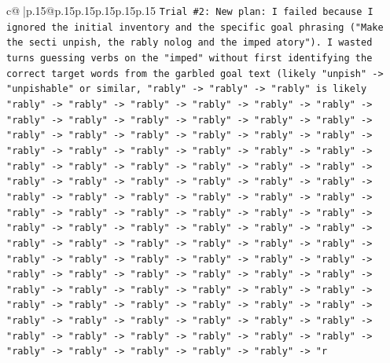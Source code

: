 \documentclass{article}
\begin{document}
{\begin{supertabular}{c@{$\;$}|p{.15\linewidth}@{}p{.15\linewidth}p{.15\linewidth}p{.15\linewidth}p{.15\linewidth}p{.15\linewidth}}
{{{\texttt{Trial \#2: New plan: I failed because I ignored the initial inventory and the specific goal phrasing ("Make the secti unpish, the rably nolog and the imped atory"). I wasted turns guessing verbs on the "imped" without first identifying the correct target words from the garbled goal text (likely "unpish" {-}> "unpishable" or similar, "rably" {-}> "rably" {-}> "rably" is likely "rably" {-}> "rably" {-}> "rably" {-}> "rably" {-}> "rably" {-}> "rably" {-}> "rably" {-}> "rably" {-}> "rably" {-}> "rably" {-}> "rably" {-}> "rably" {-}> "rably" {-}> "rably" {-}> "rably" {-}> "rably" {-}> "rably" {-}> "rably" {-}> "rably" {-}> "rably" {-}> "rably" {-}> "rably" {-}> "rably" {-}> "rably" {-}> "rably" {-}> "rably" {-}> "rably" {-}> "rably" {-}> "rably" {-}> "rably" {-}> "rably" {-}> "rably" {-}> "rably" {-}> "rably" {-}> "rably" {-}> "rably" {-}> "rably" {-}> "rably" {-}> "rably" {-}> "rably" {-}> "rably" {-}> "rably" {-}> "rably" {-}> "rably" {-}> "rably" {-}> "rably" {-}> "rably" {-}> "rably" {-}> "rably" {-}> "rably" {-}> "rably" {-}> "rably" {-}> "rably" {-}> "rably" {-}> "rably" {-}> "rably" {-}> "rably" {-}> "rably" {-}> "rably" {-}> "rably" {-}> "rably" {-}> "rably" {-}> "rably" {-}> "rably" {-}> "rably" {-}> "rably" {-}> "rably" {-}> "rably" {-}> "rably" {-}> "rably" {-}> "rably" {-}> "rably" {-}> "rably" {-}> "rably" {-}> "rably" {-}> "rably" {-}> "rably" {-}> "rably" {-}> "rably" {-}> "rably" {-}> "rably" {-}> "rably" {-}> "rably" {-}> "rably" {-}> "rably" {-}> "rably" {-}> "rably" {-}> "rably" {-}> "rably" {-}> "rably" {-}> "rably" {-}> "rably" {-}> "rably" {-}> "rably" {-}> "rably" {-}> "rably" {-}> "rably" {-}> "rably" {-}> "rably" {-}> "rably" {-}> "rably" {-}> "r} \\
\\ 
}}}
\end{supertabular}}
\end{document}
